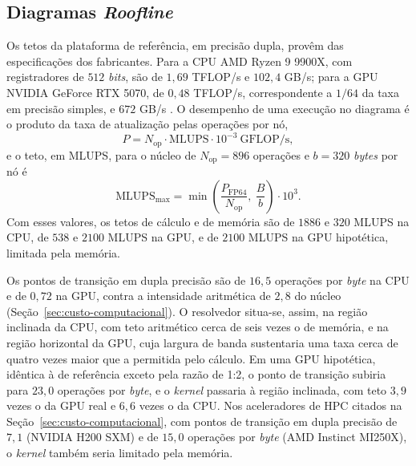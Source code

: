 \subsection{Diagramas \textit{Roofline}}\label{subsec:diagramas-roofline}

Os tetos da plataforma de referência, em precisão dupla, provêm das especificações dos fabricantes.
Para a CPU AMD Ryzen 9 9900X, com registradores de \(512\) \textit{bits}, são de \(1{,}69\) TFLOP/s e \(102{,}4\) GB/s; para a GPU NVIDIA GeForce RTX 5070, de \(0{,}48\) TFLOP/s, correspondente a \(1/64\) da taxa em precisão simples, e \(672\) GB/s \parencite{NVIDIA2025RTXBlackwell}.
O desempenho de uma execução no diagrama é o produto da taxa de atualização pelas operações por nó,
\begin{equation}
    P = N_{\mathrm{op}} \cdot \mathrm{MLUPS} \cdot 10^{-3}\ \text{GFLOP/s},
    \label{eq:desempenho-gflops}
\end{equation}
e o teto, em MLUPS, para o núcleo de \(N_{\mathrm{op}} = 896\) operações e \(b = 320\) \textit{bytes} por nó é
\begin{equation}
    \mathrm{MLUPS}_{\max} = \min\!\left(\frac{P_{\mathrm{FP64}}}{N_{\mathrm{op}}},\ \frac{B}{b}\right) \cdot 10^{3}.
    \label{eq:teto-mlups}
\end{equation}
Com esses valores, os tetos de cálculo e de memória são de \(1886\) e \(320\) MLUPS na CPU, de \(538\) e \(2100\) MLUPS na GPU, e de \(2100\) MLUPS na GPU hipotética, limitada pela memória.

Os pontos de transição em dupla precisão são de \(16{,}5\) operações por \textit{byte} na CPU e de \(0{,}72\) na GPU, contra a intensidade aritmética de \(2{,}8\) do núcleo (Seção~\ref{sec:custo-computacional}).
O resolvedor situa-se, assim, na região inclinada da CPU, com teto aritmético cerca de seis vezes o de memória, e na região horizontal da GPU, cuja largura de banda sustentaria uma taxa cerca de quatro vezes maior que a permitida pelo cálculo.
Em uma GPU hipotética, idêntica à de referência exceto pela razão de 1:2, o ponto de transição subiria para \(23{,}0\) operações por \textit{byte}, e o \textit{kernel} passaria à região inclinada, com teto \(3{,}9\) vezes o da GPU real e \(6{,}6\) vezes o da CPU.
Nos aceleradores de HPC citados na Seção~\ref{sec:custo-computacional}, com pontos de transição em dupla precisão de \(7{,}1\) (NVIDIA H200 SXM) e de \(15{,}0\) operações por \textit{byte} (AMD Instinct MI250X), o \textit{kernel} também seria limitado pela memória.

